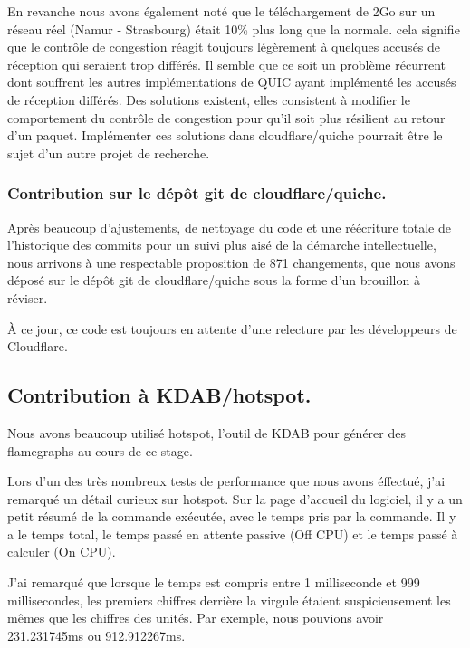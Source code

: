 En revanche nous avons également noté que le téléchargement de 2Go sur un réseau réel (Namur - Strasbourg) était 10\% plus long que la normale. cela signifie que le contrôle de congestion réagit toujours légèrement à quelques accusés de réception qui seraient trop différés.
Il semble que ce soit un problème récurrent dont souffrent les autres implémentations de QUIC ayant implémenté les accusés de réception différés. Des solutions existent, elles consistent à modifier le comportement du contrôle de congestion pour qu'il soit plus résilient au retour d'un paquet. Implémenter ces solutions dans cloudflare/quiche pourrait être le sujet d'un autre projet de recherche.

\subsubsection{Contribution sur le dépôt git de cloudflare/quiche.}

Après beaucoup d'ajustements, de nettoyage du code et une réécriture totale de l'historique des commits pour un suivi plus aisé de la démarche intellectuelle, nous arrivons à une respectable proposition de 871 changements, que nous avons déposé sur le dépôt git de cloudflare/quiche sous la forme d'un brouillon à réviser\up{\ref{cloudflare-pr}}.

À ce jour, ce code est toujours en attente d'une relecture par les développeurs de Cloudflare.

\newpage

\subsection{Contribution à KDAB/hotspot.}

Nous avons beaucoup utilisé hotspot, l'outil de KDAB pour générer des flamegraphs au cours de ce stage.

Lors d'un des très nombreux tests de performance que nous avons éffectué, j'ai remarqué un détail curieux sur hotspot.
Sur la page d'accueil du logiciel, il y a un petit résumé de la commande exécutée, avec le temps pris par la commande.
Il y a le temps total, le temps passé en attente passive (Off CPU) et le temps passé à calculer (On CPU).

J'ai remarqué que lorsque le temps est compris entre 1 milliseconde et 999 millisecondes, les premiers chiffres derrière la virgule étaient suspicieusement les mêmes que les chiffres des unités.
Par exemple, nous pouvions avoir 231.231745ms ou 912.912267ms.

